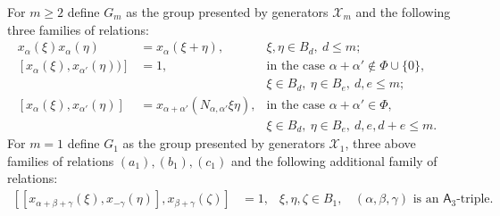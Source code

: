 \documentclass[oneside, 10pt]{amsart}
\newcommand{\rA}{\mathsf{A}}
\newcommand{\XX}[1]{\mathcal{X}_{#1}}
\numberwithin{equation}{section}
\numberwithin{lemma}{section}
\theoremstyle{definition}
\theoremstyle{remark}
\newtheorem{rem}[lemma]{Remark}
\begin{document}
\begin{comment} 
\begin{rem}
There are several reasons why we can not simply refer to~\cite{Re75} or~\cite{RS76} and need to reproduce arguments from these papers.
\begin{itemize}
 \item Rehmann and Soul{\'e} deal with usual polynomial rings rather than $\mathbb{Z}$-graded rings
  (i.\,e. their results correspond to the special case $\mathfrak{m}=0$ of our result);
 \item Presentations from~\cite{Re75,RS76} are formulated in terms of generating set $\XX{2}$ which is not sufficient for our purposes
  (we need a presentation in terms of $\XX{1}$);
 \item It is assumed that $A=k$ is a field in~\cite{Re75} and that $A=\mathbb{Z}$ in~\cite{RS76}, while we work with
  arbitrary coefficient rings $A$.
\end{itemize} 
\end{rem}
\end{comment} %

For $m\geq 2$ define $G_m$ as the group presented by generators $\mathcal{X}_m$ and the following three families of relations:
\begin{align}
 \label{eq:am} \tag{$a_m$} x_{\alpha}(\xi) x_{\alpha}(\eta) & = x_{\alpha}(\xi+\eta),&  \xi,\eta\in B_d,\ d\leq m;&\\
 \label{eq:bm} \tag{$b_m$} [x_\alpha(\xi), x_{\alpha'}(\eta))] &  = 1, & \text{in the case $\alpha+\alpha'\not\in\Phi\cup\{0\}$,}\\
 \nonumber                                                     &       & \xi \in B_d,\ \eta \in B_e,\ d,e\leq m;\\
 \label{eq:cm} \tag{$c_m$} [x_\alpha(\xi), x_{\alpha'}(\eta)] & = x_{\alpha+\alpha'}(N_{\alpha,\alpha'}\xi\eta), & \text{in the case $\alpha+\alpha'\in \Phi$,}\\
 \nonumber                                                    &  & \xi \in B_d,\ \eta \in B_e,\ d, e, d+e \leq m.
 \end{align}
For $m=1$ define $G_1$ as the group presented by generators $\mathcal{X}_1$, 
three above families of relations $(a_1), (b_1), (c_1)$ and the following additional family of relations:
\begin{align}  \label{eq:d1} \tag{$d_1$} [[x_{\alpha+\beta+\gamma}(\xi), x_{-\gamma}(\eta)], x_{\beta+\gamma}(\zeta) ] & = 1, 
 & \xi,\eta,\zeta\in B_1,\ \text{ $(\alpha, \beta, \gamma)$ is an $\rA_3$-triple. }
\end{align}
\end{document}
